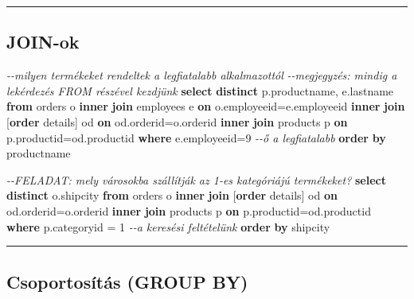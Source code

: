 \documentclass[
  magyar,
]{article}
\newenvironment{Shaded}{}{}
\newcommand{\CommentTok}[1]{\textcolor[rgb]{0.38,0.63,0.69}{\textit{#1}}}
\newcommand{\DecValTok}[1]{\textcolor[rgb]{0.25,0.63,0.44}{#1}}
\newcommand{\KeywordTok}[1]{\textcolor[rgb]{0.00,0.44,0.13}{\textbf{#1}}}
\newcommand{\NormalTok}[1]{#1}
\newcommand{\OperatorTok}[1]{\textcolor[rgb]{0.40,0.40,0.40}{#1}}
\begin{document}
\begin{center}\rule{0.5\linewidth}{0.5pt}\end{center}

\subsection{JOIN-ok}\label{join-ok}

\begin{Shaded}
\begin{Highlighting}[]
\CommentTok{{-}{-}milyen termékeket rendeltek a legfiatalabb alkalmazottól}
\CommentTok{{-}{-}megjegyzés: mindig a lekérdezés FROM részével kezdjünk}
\KeywordTok{select} \KeywordTok{distinct}\NormalTok{ p.productname, e.lastname}
\KeywordTok{from}\NormalTok{ orders o }\KeywordTok{inner} \KeywordTok{join}\NormalTok{ employees e }\KeywordTok{on}\NormalTok{ o.employeeid}\OperatorTok{=}\NormalTok{e.employeeid}
\KeywordTok{inner} \KeywordTok{join}\NormalTok{ [}\KeywordTok{order}\NormalTok{ details] od }\KeywordTok{on}\NormalTok{ od.orderid}\OperatorTok{=}\NormalTok{o.orderid}
\KeywordTok{inner} \KeywordTok{join}\NormalTok{ products p }\KeywordTok{on}\NormalTok{ p.productid}\OperatorTok{=}\NormalTok{od.productid}
\KeywordTok{where}\NormalTok{ e.employeeid}\OperatorTok{=}\DecValTok{9} \CommentTok{{-}{-}ő a legfiatalabb}
\KeywordTok{order} \KeywordTok{by}\NormalTok{ productname}

\CommentTok{{-}{-}FELADAT: mely városokba szállítják az 1{-}es kategóriájú termékeket?}
\KeywordTok{select} \KeywordTok{distinct}\NormalTok{ o.shipcity}
\KeywordTok{from}\NormalTok{ orders o }\KeywordTok{inner} \KeywordTok{join}\NormalTok{ [}\KeywordTok{order}\NormalTok{ details] od }\KeywordTok{on}\NormalTok{ od.orderid}\OperatorTok{=}\NormalTok{o.orderid}
\KeywordTok{inner} \KeywordTok{join}\NormalTok{ products p }\KeywordTok{on}\NormalTok{ p.productid}\OperatorTok{=}\NormalTok{od.productid}
\KeywordTok{where}\NormalTok{ p.categoryid }\OperatorTok{=} \DecValTok{1} \CommentTok{{-}{-}a keresési feltételünk}
\KeywordTok{order} \KeywordTok{by}\NormalTok{ shipcity}
\end{Highlighting}
\end{Shaded}

\begin{center}\rule{0.5\linewidth}{0.5pt}\end{center}

\subsection{Csoportosítás (GROUP
BY)}\label{csoportosuxedtuxe1s-group-by}
\end{document}
